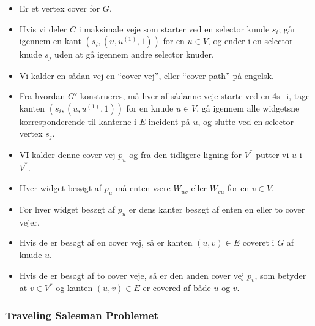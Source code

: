 \begin{frame}[allowframebreaks]
\begin{itemize}
		\item Er et vertex cover for $G$.
		\item Hvis vi deler $C$ i maksimale veje som starter ved en selector knude $s_{i}$; går igennem en kant $(s_{i}, (u, u^{(1)}, 1))$ for en $u \in V$, og ender i en selector knude $s_{j}$ uden at gå igennem andre selector knuder.
		\item Vi kalder en sådan vej en ``cover vej'', eller ``cover path'' på engelsk.
		\item Fra hvordan $G'$ konstrueres, må hver af sådanne veje starte ved en 4s_i, tage kanten $(s_{i}, (u, u^{(1)}, 1))$ for en knude $u \in V$, gå igennem alle widgetsne korresponderende til kanterne i $E$ incident på $u$, og slutte ved en selector vertex $s_{j}$.
		\item VI kalder denne cover vej $p_u$ og fra den tidligere ligning for $V^*$ putter vi $u$ i $V^{*}$.
		\item Hver widget besøgt af $p_{u}$ må enten være $W_{uv}$ eller $W_{vu}$ for en $v \in V$.
		\item For hver widget besøgt af $p_u$ er dens kanter besøgt af enten en eller to cover vejer.
		\item Hvis de er besøgt af en cover vej, så er kanten $(u,v) \in E$ coveret i $G$ af knude $u$.
		\item Hvis de er besøgt af to cover veje, så er den anden cover vej $p_{v}$, som betyder at $v \in V^{*}$ og kanten $(u,v) \in E$ er covered af både $u$ og $v$.
	\end{itemize}
\end{frame}

\begin{frame}[allowframebreaks]
	\frametitle{Traveling Salesman Problemet}

\end{frame}

